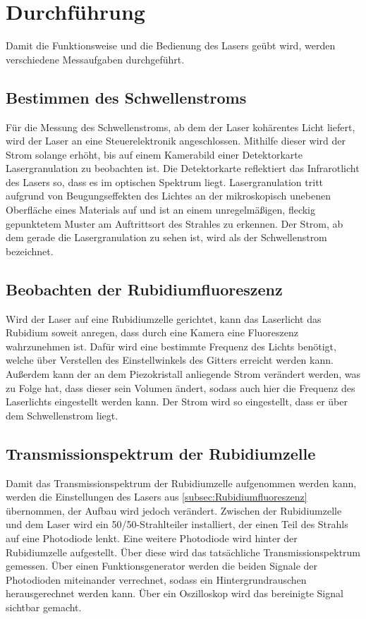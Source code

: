 \section{Durchführung}
\label{sec:Durchführung}
Damit die Funktionsweise und die Bedienung des Lasers geübt wird, werden verschiedene Messaufgaben durchgeführt.


\subsection{Bestimmen des Schwellenstroms}
\label{subsec:Schwellenstrom}
Für die Messung des Schwellenstroms, ab dem der Laser kohärentes Licht liefert, wird der Laser an eine Steuerelektronik angeschlossen. Mithilfe
dieser wird der Strom solange erhöht, bis auf einem Kamerabild einer Detektorkarte Lasergranulation zu beobachten ist. Die Detektorkarte reflektiert das Infrarotlicht
des Lasers so, dass es im optischen Spektrum liegt. Lasergranulation tritt aufgrund von Beugungseffekten des Lichtes an der mikroskopisch unebenen Oberfläche eines Materials auf
und ist an einem unregelmäßigen, fleckig gepunktetem Muster am Auftrittsort des Strahles zu erkennen.
Der Strom, ab dem gerade die Lasergranulation zu sehen ist, wird als der Schwellenstrom bezeichnet.


\subsection{Beobachten der Rubidiumfluoreszenz}
\label{subsec:Rubidiumfluoreszenz}
Wird der Laser auf eine Rubidiumzelle gerichtet, kann das Laserlicht das Rubidium soweit anregen, dass durch eine Kamera eine Fluoreszenz wahrzunehmen ist.
Dafür wird eine bestimmte Frequenz des Lichts benötigt, welche über Verstellen des Einstellwinkels des Gitters erreicht werden kann. Außerdem kann der an dem
Piezokristall anliegende Strom verändert werden, was zu Folge hat, dass dieser sein Volumen ändert, sodass auch hier die Frequenz des Laserlichts eingestellt
werden kann. Der Strom wird so eingestellt, dass er über dem Schwellenstrom liegt.


\subsection{Transmissionspektrum der Rubidiumzelle}
Damit das Transmissionspektrum der Rubidiumzelle aufgenommen werden kann, werden die Einstellungen des Lasers aus \autoref{subsec:Rubidiumfluoreszenz} übernommen, der
Aufbau wird jedoch verändert. Zwischen der Rubidiumzelle und dem Laser wird ein 50/50-Strahlteiler installiert, der einen Teil des Strahls auf eine Photodiode lenkt.
Eine weitere Photodiode wird hinter der Rubidiumzelle aufgestellt. Über diese wird das tatsächliche Transmissionspektrum gemessen. Über einen Funktionsgenerator werden
die beiden Signale der Photodioden miteinander verrechnet, sodass ein Hintergrundrauschen herausgerechnet werden kann. Über ein Oszilloskop wird das bereinigte Signal
sichtbar gemacht.

